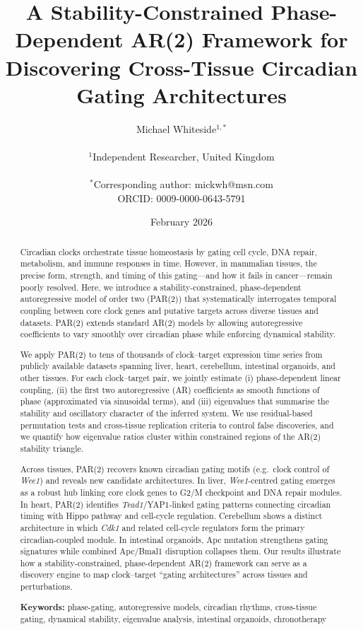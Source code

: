 \documentclass[11pt,letterpaper]{article}
\title{\textbf{A Stability-Constrained Phase-Dependent AR(2) Framework for Discovering Cross-Tissue Circadian Gating Architectures}}
\author{
Michael Whiteside$^{1,*}$ \\
\\
$^1$Independent Researcher, United Kingdom \\
\\
$^*$Corresponding author: mickwh@msn.com \\
ORCID: 0009-0000-0643-5791
}
\date{February 2026}
\begin{document}
\maketitle

\begin{abstract}
\noindent Circadian clocks orchestrate tissue homeostasis by gating cell cycle, DNA repair, metabolism, and immune responses in time. However, in mammalian tissues, the precise form, strength, and timing of this gating---and how it fails in cancer---remain poorly resolved. Here, we introduce a stability-constrained, phase-dependent autoregressive model of order two (PAR(2)) that systematically interrogates temporal coupling between core clock genes and putative targets across diverse tissues and datasets. PAR(2) extends standard AR(2) models by allowing autoregressive coefficients to vary smoothly over circadian phase while enforcing dynamical stability.

We apply PAR(2) to tens of thousands of clock--target expression time series from publicly available datasets spanning liver, heart, cerebellum, intestinal organoids, and other tissues. For each clock--target pair, we jointly estimate (i) phase-dependent linear coupling, (ii) the first two autoregressive (AR) coefficients as smooth functions of phase (approximated via sinusoidal terms), and (iii) eigenvalues that summarise the stability and oscillatory character of the inferred system. We use residual-based permutation tests and cross-tissue replication criteria to control false discoveries, and we quantify how eigenvalue ratios cluster within constrained regions of the AR(2) stability triangle.

Across tissues, PAR(2) recovers known circadian gating motifs (e.g.\ clock control of \textit{Wee1}) and reveals new candidate architectures. In liver, \textit{Wee1}-centred gating emerges as a robust hub linking core clock genes to G2/M checkpoint and DNA repair modules. In heart, PAR(2) identifies \textit{Tead1}/YAP1-linked gating patterns connecting circadian timing with Hippo pathway and cell-cycle regulation. Cerebellum shows a distinct architecture in which \textit{Cdk1} and related cell-cycle regulators form the primary circadian-coupled module. In intestinal organoids, Apc mutation strengthens gating signatures while combined Apc/Bmal1 disruption collapses them. Our results illustrate how a stability-constrained, phase-dependent AR(2) framework can serve as a discovery engine to map clock--target ``gating architectures'' across tissues and perturbations.

\noindent\textbf{Keywords:} phase-gating, autoregressive models, circadian rhythms, cross-tissue gating, dynamical stability, eigenvalue analysis, intestinal organoids, chronotherapy
\end{abstract}
\end{document}
